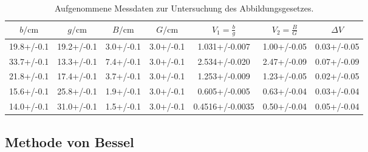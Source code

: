 \begin{table}
  \caption{Aufgenommene Messdaten zur Untersuchung des Abbildungsgesetzes.}
  \label{tab:groesse}
  \centering
\begin{tabular}{ccccccc}
  \toprule
  $b/\si{\centi\meter} $& $g/\si{\centi\meter} $& $B/\si{\centi\meter} $& $G/\si{\centi\meter}$ &$ V_{\mathrm{1}}=\frac{b}{g}$ & $V_\mathrm{2}=\frac{B}{G}$ & $\Delta V$ \\
\midrule
  19.8+/-0.1 & 19.2+/-0.1 & 3.0+/-0.1 & 3.0+/-0.1 & 1.031+/-0.007 & 1.00+/-0.05 & 0.03+/-0.05 \\
  33.7+/-0.1 & 13.3+/-0.1 & 7.4+/-0.1 & 3.0+/-0.1 & 2.534+/-0.020 & 2.47+/-0.09 & 0.07+/-0.09 \\
  21.8+/-0.1 & 17.4+/-0.1 & 3.7+/-0.1 & 3.0+/-0.1 & 1.253+/-0.009 & 1.23+/-0.05 & 0.02+/-0.05 \\
  15.6+/-0.1 & 25.8+/-0.1 & 1.9+/-0.1 & 3.0+/-0.1 & 0.605+/-0.005 & 0.63+/-0.04 & 0.03+/-0.04 \\
  14.0+/-0.1 & 31.0+/-0.1 & 1.5+/-0.1 & 3.0+/-0.1 & 0.4516+/-0.0035 & 0.50+/-0.04 & 0.05+/-0.04 \\
\bottomrule
\end{tabular}
\end{table}
\FloatBarrier
\subsection{Methode von Bessel}
